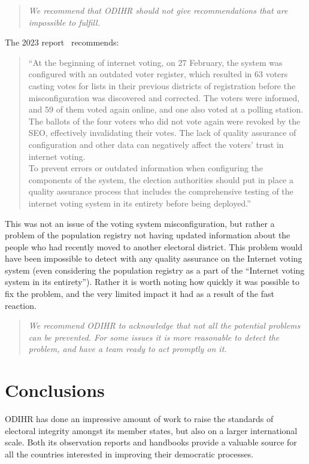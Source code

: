 \documentclass{llncs}
\begin{document}
\begin{quote}
    \emph{We recommend that ODIHR should not give recommendations that are impossible to fulfill.}
\end{quote}
%
The 2023 report~\cite{ODIHR2023} recommends:

\begin{quote}
    ``At the beginning of internet voting, on 27 February, the system was configured with an outdated voter register, which resulted in 63 voters casting votes for lists in their previous districts of registration before the misconfiguration was discovered and corrected. The voters were informed, and 59 of them voted again online, and one also voted at a polling station. The ballots of the four voters who did not vote again were revoked by the SEO, effectively invalidating their votes. The lack of quality assurance of configuration and other data can negatively affect the voters' trust in internet voting. \\[1ex]
    To prevent errors or outdated information when configuring the components of the system, the election authorities should put in place a quality assurance process that includes the comprehensive testing of the internet voting system in its entirety before being deployed.''
\end{quote}

This was not an issue of the voting system misconfiguration, but rather a problem of the population registry not having updated information about the people who had recently moved to another electoral district. This problem would have been impossible to detect with any quality assurance on the Internet voting system (even considering the population registry as a part of the ``Internet voting system in its entirety'').  Rather it is worth noting how quickly it was possible to fix the problem, and the very limited impact it had as a result of the fast reaction.

\begin{quote}
    \emph{We recommend ODIHR to acknowledge that not all the potential problems can be prevented. For some issues it is more reasonable to detect the problem, and have a team ready to act promptly on it.}
\end{quote}

\section{Conclusions}

ODIHR has done an impressive amount of work to raise the standards of electoral integrity amongst its member states, but also on a larger international scale. Both its observation reports and handbooks provide a valuable source for all the countries interested in improving their democratic processes.
\end{document}

